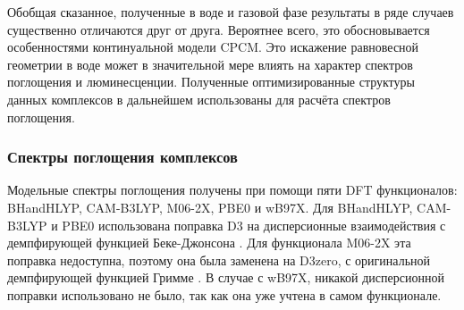 \documentclass[a4paper,12pt]{article}
\newcommand{\ths}{\thinspace}
\begin{document}
\begin{onehalfspace}
	
	Обобщая сказанное, полученные в воде и газовой фазе результаты в ряде случаев существенно отличаются друг от друга. Вероятнее всего, это обосновывается особенностями континуальной модели CPCM. Это искажение равновесной геометрии в воде может в значительной мере влиять на характер спектров поглощения и люминесценции. Полученные оптимизированные структуры данных комплексов в дальнейшем использованы для расчёта спектров поглощения.
	
	\subsubsection*{Спектры поглощения комплексов}
	
	Модельные спектры поглощения получены при помощи пяти DFT функционалов: BHandHLYP, CAM-B3LYP, M06-2X, PBE0 и wB97X. Для BHandHLYP, CAM-B3LYP и PBE0 использована поправка D3 на дисперсионные взаимодействия с демпфирующей функцией Беке-Джонсона \cite{Grimme2011}. Для функционала M06-2X эта поправка недоступна, поэтому она была заменена на D3zero, с оригинальной демпфирующей функцией Гримме \cite{Grimme2010}. В случае с wB97X, никакой дисперсионной поправки использовано не было, так как она уже учтена в самом функционале. 
	
	

\end{onehalfspace}
\end{document}
